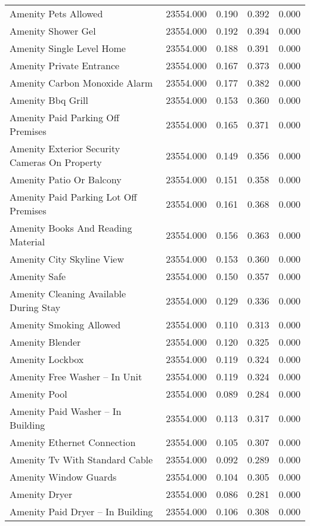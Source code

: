 \begin{tabular}{lllll}
Amenity Pets Allowed & 23554.000 & 0.190 & 0.392 & 0.000 \\
Amenity Shower Gel & 23554.000 & 0.192 & 0.394 & 0.000 \\
Amenity Single Level Home & 23554.000 & 0.188 & 0.391 & 0.000 \\
Amenity Private Entrance & 23554.000 & 0.167 & 0.373 & 0.000 \\
Amenity Carbon Monoxide Alarm & 23554.000 & 0.177 & 0.382 & 0.000 \\
Amenity Bbq Grill & 23554.000 & 0.153 & 0.360 & 0.000 \\
Amenity Paid Parking Off Premises & 23554.000 & 0.165 & 0.371 & 0.000 \\
Amenity Exterior Security Cameras On Property & 23554.000 & 0.149 & 0.356 & 0.000 \\
Amenity Patio Or Balcony & 23554.000 & 0.151 & 0.358 & 0.000 \\
Amenity Paid Parking Lot Off Premises & 23554.000 & 0.161 & 0.368 & 0.000 \\
Amenity Books And Reading Material & 23554.000 & 0.156 & 0.363 & 0.000 \\
Amenity City Skyline View & 23554.000 & 0.153 & 0.360 & 0.000 \\
Amenity Safe & 23554.000 & 0.150 & 0.357 & 0.000 \\
Amenity Cleaning Available During Stay & 23554.000 & 0.129 & 0.336 & 0.000 \\
Amenity Smoking Allowed & 23554.000 & 0.110 & 0.313 & 0.000 \\
Amenity Blender & 23554.000 & 0.120 & 0.325 & 0.000 \\
Amenity Lockbox & 23554.000 & 0.119 & 0.324 & 0.000 \\
Amenity Free Washer – In Unit & 23554.000 & 0.119 & 0.324 & 0.000 \\
Amenity Pool & 23554.000 & 0.089 & 0.284 & 0.000 \\
Amenity Paid Washer – In Building & 23554.000 & 0.113 & 0.317 & 0.000 \\
Amenity Ethernet Connection & 23554.000 & 0.105 & 0.307 & 0.000 \\
Amenity Tv With Standard Cable & 23554.000 & 0.092 & 0.289 & 0.000 \\
Amenity Window Guards & 23554.000 & 0.104 & 0.305 & 0.000 \\
Amenity Dryer & 23554.000 & 0.086 & 0.281 & 0.000 \\
Amenity Paid Dryer – In Building & 23554.000 & 0.106 & 0.308 & 0.000 \\

\end{tabular}
